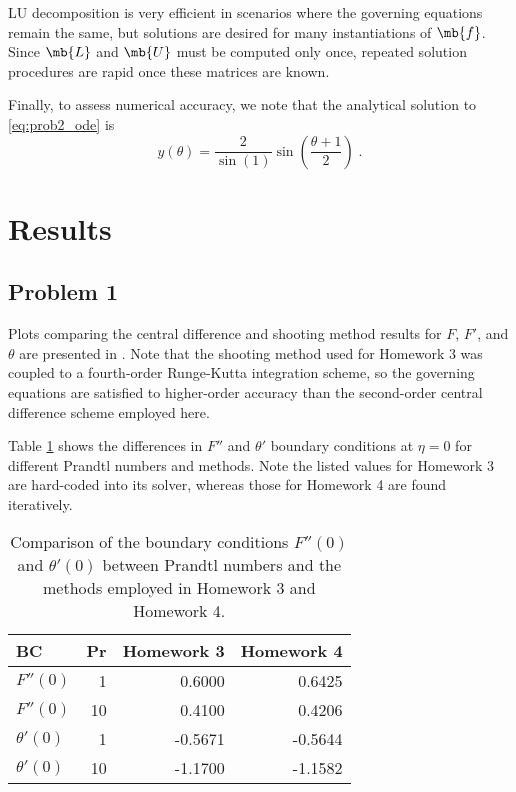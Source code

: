 \documentclass[11pt]{article}
\begin{document}
LU decomposition is very efficient in scenarios where the governing equations remain the same, but solutions are desired for many instantiations of $\mb{f}$. Since $\mb{L}$ and $\mb{U}$ must be computed only once, repeated solution procedures are rapid once these matrices are known.

Finally, to assess numerical accuracy, we note that the analytical solution to \eqref{eq:prob2_ode} is
\begin{equation}
y(\theta) = \frac{2}{\sin(1)} \sin \left( \frac{\theta + 1}{2} \right)
\;.
\end{equation}

\section{Results} %

\subsection{Problem 1}

Plots comparing the central difference and shooting method results for $F$, $F'$, and $\theta$ are presented in . Note that the shooting method used for Homework 3 was coupled to a fourth-order Runge-Kutta integration scheme, so the governing equations are satisfied to higher-order accuracy than the second-order central difference scheme employed here.

Table \ref{tbl:Prob1} shows the differences in $F''$ and $\theta'$ boundary conditions at $\eta = 0$ for different Prandtl numbers and methods. Note the listed values for Homework 3 are hard-coded into its solver, whereas those for Homework 4 are found iteratively.

\begin{table}[h!]
\centering
\begin{tabular}{lrrr}
\toprule
BC & Pr & Homework 3 & Homework 4 \\
\midrule
    $F''(0)$ &  1 &  0.6000 &  0.6425 \\
    $F''(0)$ & 10 &  0.4100 &  0.4206 \\
$\theta'(0)$ &  1 & -0.5671 & -0.5644 \\
$\theta'(0)$ & 10 & -1.1700 & -1.1582 \\
\bottomrule
\end{tabular}
\\[6pt]
\caption{Comparison of the boundary conditions $F''(0)$ and $\theta'(0)$ between Prandtl numbers and the methods employed in Homework 3 and Homework 4.}
\label{tbl:Prob1}
\end{table}
\end{document}
